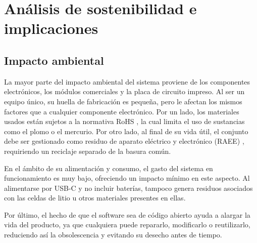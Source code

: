 
\chapter{Análisis de sostenibilidad e implicaciones}
\label{ch:impacto}

\section{Impacto ambiental}
\label{sec:impacto_ambiental}

La mayor parte del impacto ambiental del sistema proviene de los componentes electrónicos, los módulos comerciales y la placa de circuito impreso. Al ser un equipo único, su huella de fabricación es pequeña, pero le afectan los mismos factores que a cualquier componente electrónico. Por un lado, los materiales usados están sujetos a la normativa RoHS \cite{dir_rohs}, la cual limita el uso de sustancias como el plomo o el mercurio. Por otro lado, al final de su vida útil, el conjunto debe ser gestionado como residuo de aparato eléctrico y electrónico (RAEE) \cite{dir_raee}, requiriendo un reciclaje separado de la basura común.

En el ámbito de su alimentación y consumo, el gasto del sistema en funcionamiento es muy bajo, ofreciendo un impacto mínimo en este aspecto. Al alimentarse por USB-C y no incluir baterías, tampoco genera residuos asociados con las celdas de litio u otros materiales presentes en ellas.

Por último, el hecho de que el software sea de código abierto ayuda a alargar la vida del producto, ya que cualquiera puede repararlo, modificarlo o reutilizarlo, reduciendo así la obsolescencia y evitando su desecho antes de tiempo.